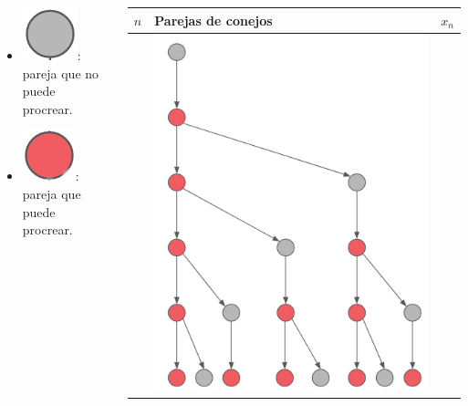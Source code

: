 {\begin{frame}
	\begin{columns}[t]
		\hspace{-10mm}
		\begin{column}{0.5\textwidth}
			\vspace{-2mm}
			\begin{itemize}
				\item[] \includegraphics[scale=0.25]{imagenes/off}: pareja que no puede procrear. \\[2mm]
				\item[] \includegraphics[scale=0.25]{imagenes/on}: pareja que puede procrear.
			\end{itemize}
		\end{column}
		\hspace{-1cm}
		\begin{column}{0.4\textwidth}	
			\vspace{-10mm}
			\centering
			\begin{table}[H]
				\centering
				\begin{tabular}{| c | m{3cm} | c |}
					\hline
					$n$ & Parejas de conejos & $x_n$ \\
					\hline
					&  \vspace{1mm} \includegraphics[scale=0.18]{imagenes/fibonacci} &  \\

\end{tabular}
\end{table}
\end{column}
\end{columns}
\end{frame}}
